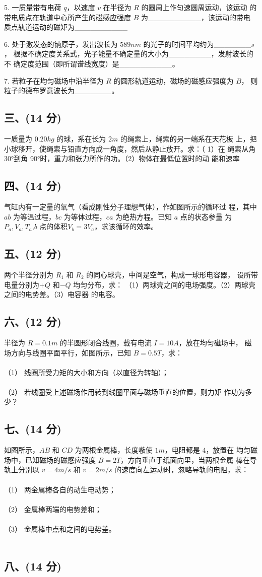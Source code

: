 5. 一质量带有电荷 $q$，以速度 $v$ 在半径为 $R$ 的圆周上作匀速圆周运动，该运动
的带电质点在轨道中心所产生的磁感应强度 $B$ 为__________，该运动的带电
质点轨道运动的磁矩为__________

6. 处于激发态的钠原子，发出波长为 $589nm$ 的光子的时间平均约为_______$s$，
根据不确定度关系式，光子能量不确定量的大小为________，发射波长的不
确定度范围（即所谓谱线宽度）是__________。

7. 若粒子在均匀磁场中沿半径为 $R$ 的圆形轨道运动，磁场的磁感应强度为 $B$，
则粒子的德布罗意波长为_______。
\subsection{三、(14 分)}
一质量为 $0.20kg$ 的球，系在长为 $2m$ 的绳索上，绳索的另一端系在天花板
上，把小球移开，使绳索与铅直方向成一角度，然后从静止放开。求：（ 1）在
绳索从角 30°到角 90°时，重力和张力所作的功。（2）物体在最低位置时的动
能和速率
\subsection{四、(14 分)}
气缸内有一定量的氧气（看成刚性分子理想气体），作如图所示的循环过
程，其中 $ab$ 为等温过程，$bc$ 为等体过程，$ca$ 为绝热方程。已知 $a$ 点的状态参量
为$P_a,V_a,T_a$,$b$ 点的体积$V_b=3V_a$，求该循环的效率。
\subsection{五、(12 分)}
两个半径分别为 $R_1$ 和 $R_2$ 的同心球壳，中间是空气，构成一球形电容器，
设所带电量分别为$+Q$ 和$-Q$ 均匀分布，求：
（1）两球壳之间的电场强度。（2）两球壳之间的电势差。（3）电容器
的电容。
\subsection{六、(12 分)}
半径为 $R=0.1m$ 的半圆形闭合线圈，载有电流 $I=10A$，放在均匀磁场中，
磁场方向与线圈平面平行，如图所示，已知 $B=0.5T$，求：\\\\
（1） 线圈所受力矩的大小和方向（以直径为转轴）；\\\\
（2） 若线圈受上述磁场作用转到线圈平面与磁场垂直的位置，则力矩
作功为多少？
\subsection{七、(14 分)}
如图所示，$AB$ 和 $CD$ 为两根金属棒，长度嗾使 $1m$，电阻都是 $4$，放置在
均匀磁场中，已知磁场的磁感应强度 $B=2T$，方向垂直于纸面向里，当两根金属
棒在导轨上分别以 $v=4m/s$ 和 $v=2m/s$ 的速度向左运动时，忽略导轨的电阻，求：\\\\
（1） 两金属棒各自的动生电动势；\\\\
（2） 金属棒两端的电势差和；\\\\
（3） 金属棒中点和之间的电势差。\\\\
\subsection{八、(14 分)}
